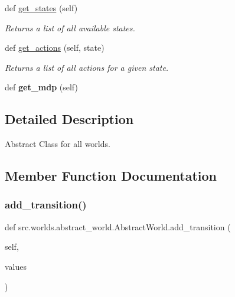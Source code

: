 \begin{DoxyCompactItemize}
def \hyperlink{classsrc_1_1worlds_1_1abstract__world_1_1_abstract_world_a1c5c774e258d31c703dc7a95280a686d}{get\+\_\+states} (self)
\begin{DoxyCompactList}\small\item\em Returns a list of all available states. \end{DoxyCompactList}\item 
def \hyperlink{classsrc_1_1worlds_1_1abstract__world_1_1_abstract_world_a177196a17a32460d8076eaffa643646b}{get\+\_\+actions} (self, state)
\begin{DoxyCompactList}\small\item\em Returns a list of all actions for a given state. \end{DoxyCompactList}\item 
\mbox{\label{classsrc_1_1worlds_1_1abstract__world_1_1_abstract_world_ad274c04e10cb0714f5efc9b7618ccc14}} 
def {\bfseries get\+\_\+mdp} (self)
\end{DoxyCompactItemize}


\subsection{Detailed Description}
Abstract Class for all worlds. 

\subsection{Member Function Documentation}
\mbox{\label{classsrc_1_1worlds_1_1abstract__world_1_1_abstract_world_a0cafa6f47ff6a2c0afe7156e40e893fe}} 
\subsubsection{\texorpdfstring{add\+\_\+transition()}{add\_transition()}}
{\footnotesize\ttfamily def src.\+worlds.\+abstract\+\_\+world.\+Abstract\+World.\+add\+\_\+transition (\begin{DoxyParamCaption}\item[{}]{self,  }\item[{}]{values }\end{DoxyParamCaption})}



